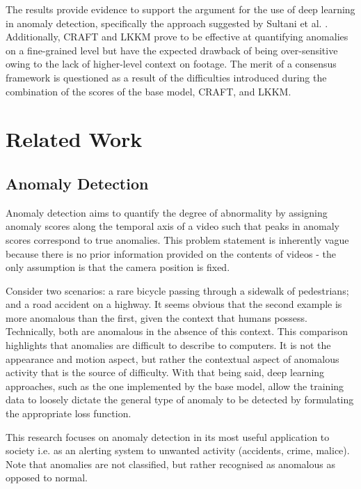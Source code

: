 \documentclass[sigplan,authorversion,nonacm, 9pt]{acmart}
\begin{document}
The results provide evidence to support the argument for the use of deep learning in anomaly detection, specifically the approach suggested by Sultani et al. \cite{sultani}. Additionally, CRAFT and LKKM prove to be effective at quantifying anomalies on a fine-grained level but have the expected drawback of being over-sensitive owing to the lack of higher-level context on footage. The merit of a consensus framework is questioned as a result of the difficulties introduced during the combination of the scores of the base model, CRAFT, and LKKM.

\section{Related Work} 
\subsection{Anomaly Detection}
Anomaly detection aims to quantify the degree of abnormality by assigning anomaly scores along the temporal axis of a video such that peaks in anomaly scores correspond to true anomalies. This problem statement is inherently vague because there is no prior information provided on the contents of videos - the only assumption is that the camera position is fixed.
\par
Consider two scenarios: a rare bicycle passing through a sidewalk of pedestrians; and a road accident on a highway. It seems obvious that the second example is more anomalous than the first, given the context that humans possess. Technically, both are anomalous in the absence of this context. This comparison highlights that anomalies are difficult to describe to computers. It is not the appearance and motion aspect, but rather the contextual aspect of anomalous activity that is the source of difficulty.  With that being said, deep learning approaches, such as the one implemented by the base model, allow the training data to loosely dictate the general type of anomaly to be detected by formulating the appropriate loss function.
\par
This research focuses on anomaly detection in its most useful application to society i.e. as an alerting system to unwanted activity (accidents, crime, malice). Note that anomalies are not classified, but rather recognised as anomalous as opposed to normal.
\end{document}

